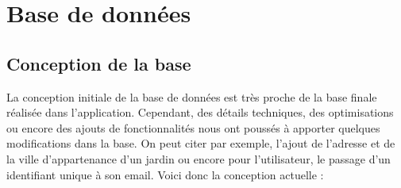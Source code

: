 \documentclass[12pt,titlepage]{report}
\begin{document}
\chapter{Base de données}

\section{Conception de la base}

La conception initiale de la base de données est très proche de la base finale réalisée dans l’application. 
Cependant, des détails techniques, des optimisations ou encore des ajouts de fonctionnalités nous ont poussés à apporter quelques modifications dans la base. On peut citer par exemple, l’ajout de l’adresse et de la ville d’appartenance d’un jardin ou encore pour l’utilisateur, le passage d’un identifiant unique à son email. Voici donc la conception actuelle : \\
\end{document}
